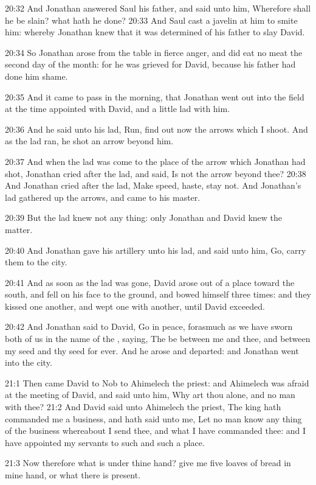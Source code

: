 20:32 And Jonathan answered Saul his father, and said unto him, Wherefore shall he be slain? what hath he done?  20:33 And Saul cast a javelin at him to smite him: whereby Jonathan knew that it was determined of his father to slay David.

20:34 So Jonathan arose from the table in fierce anger, and did eat no meat the second day of the month: for he was grieved for David, because his father had done him shame.

20:35 And it came to pass in the morning, that Jonathan went out into the field at the time appointed with David, and a little lad with him.

20:36 And he said unto his lad, Run, find out now the arrows which I shoot. And as the lad ran, he shot an arrow beyond him.

20:37 And when the lad was come to the place of the arrow which Jonathan had shot, Jonathan cried after the lad, and said, Is not the arrow beyond thee?  20:38 And Jonathan cried after the lad, Make speed, haste, stay not. And Jonathan's lad gathered up the arrows, and came to his master.

20:39 But the lad knew not any thing: only Jonathan and David knew the matter.

20:40 And Jonathan gave his artillery unto his lad, and said unto him, Go, carry them to the city.

20:41 And as soon as the lad was gone, David arose out of a place toward the south, and fell on his face to the ground, and bowed himself three times: and they kissed one another, and wept one with another, until David exceeded.

20:42 And Jonathan said to David, Go in peace, forasmuch as we have sworn both of us in the name of the \LORD, saying, The \LORD be between me and thee, and between my seed and thy seed for ever. And he arose and departed: and Jonathan went into the city.

21:1 Then came David to Nob to Ahimelech the priest: and Ahimelech was afraid at the meeting of David, and said unto him, Why art thou alone, and no man with thee?  21:2 And David said unto Ahimelech the priest, The king hath commanded me a business, and hath said unto me, Let no man know any thing of the business whereabout I send thee, and what I have commanded thee: and I have appointed my servants to such and such a place.

21:3 Now therefore what is under thine hand? give me five loaves of bread in mine hand, or what there is present.

